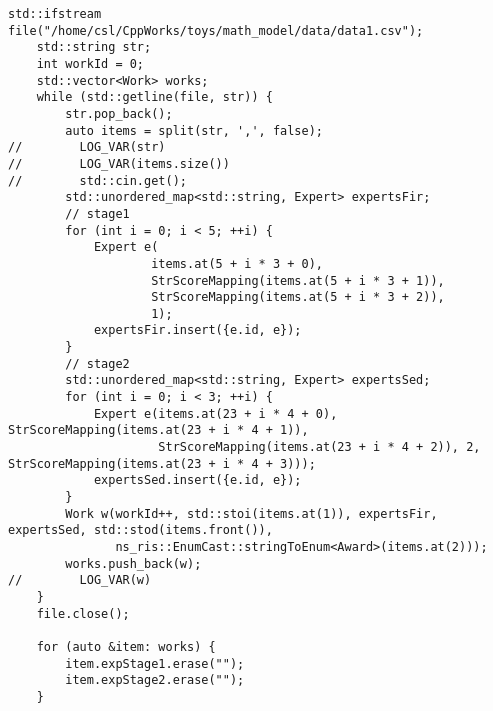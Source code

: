 \documentclass[bwprint]{gmcmthesis}
\begin{document}
\begin{lstlisting}[label=数据io,caption={数据读取}]
std::ifstream file("/home/csl/CppWorks/toys/math_model/data/data1.csv");
    std::string str;
    int workId = 0;
    std::vector<Work> works;
    while (std::getline(file, str)) {
        str.pop_back();
        auto items = split(str, ',', false);
//        LOG_VAR(str)
//        LOG_VAR(items.size())
//        std::cin.get();
        std::unordered_map<std::string, Expert> expertsFir;
        // stage1
        for (int i = 0; i < 5; ++i) {
            Expert e(
                    items.at(5 + i * 3 + 0),
                    StrScoreMapping(items.at(5 + i * 3 + 1)),
                    StrScoreMapping(items.at(5 + i * 3 + 2)),
                    1);
            expertsFir.insert({e.id, e});
        }
        // stage2
        std::unordered_map<std::string, Expert> expertsSed;
        for (int i = 0; i < 3; ++i) {
            Expert e(items.at(23 + i * 4 + 0), StrScoreMapping(items.at(23 + i * 4 + 1)),
                     StrScoreMapping(items.at(23 + i * 4 + 2)), 2, StrScoreMapping(items.at(23 + i * 4 + 3)));
            expertsSed.insert({e.id, e});
        }
        Work w(workId++, std::stoi(items.at(1)), expertsFir, expertsSed, std::stod(items.front()),
               ns_ris::EnumCast::stringToEnum<Award>(items.at(2)));
        works.push_back(w);
//        LOG_VAR(w)
    }
    file.close();

    for (auto &item: works) {
        item.expStage1.erase("");
        item.expStage2.erase("");
    }
\end{lstlisting}
\end{document}
